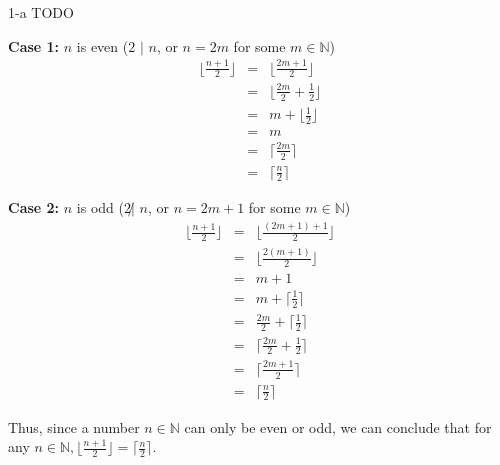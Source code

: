 \documentclass[11pt]{article}
\begin{document}
\begin{prob}{1-a}
TODO
\end{prob}
\begin{sol}

\textbf{Case 1:} $n$ is even ($2$ $|$ $n$, or $n = 2m$ for some $m \in \mathbb{N}$) 
\begin{eqnarray*}
\Big\lfloor\frac{n+1}{2}\Big\rfloor & = & \Big\lfloor\frac{2m + 1}{2}\Big\rfloor \\
& = & \Big\lfloor\frac{2m}{2}  + \frac{1}{2}\Big\rfloor\\
& = & m + \Big\lfloor\frac{1}{2}\Big\rfloor \\
& = & m \\
& = & \Big\lceil\frac{2m}{2}\Big\rceil \\
& = & \Big\lceil\frac{n}{2}\Big\rceil
\end{eqnarray*}

\textbf{Case 2:} $n$ is odd ($2 \not|$  $n$, or $n = 2m + 1$ for some $m \in \mathbb{N}$) 
\begin{eqnarray*}
\Big\lfloor\frac{n+1}{2}\Big\rfloor & = & \Big\lfloor\frac{(2m + 1) +1}{2}\Big\rfloor \\
& = & \Big\lfloor\frac{2(m + 1)}{2}\Big\rfloor \\
& = & m + 1 \\
& = & m + \Big\lceil\frac{1}{2}\Big\rceil \\
& = & \frac{2m}{2} + \Big\lceil\frac{1}{2}\Big\rceil \\
& = & \Big\lceil\frac{2m}{2} + \frac{1}{2}\Big\rceil \\
& = & \Big\lceil\frac{2m + 1}{2}\Big\rceil  \\
& = & \Big\lceil\frac{n}{2}\Big\rceil
\end{eqnarray*}

Thus, since a number $n \in \mathbb{N}$ can only be even or odd, we can conclude that for any $n \in \mathbb{N}, \Big\lfloor\frac{n+1}{2}\Big\rfloor = \Big\lceil\frac{n}{2}\Big\rceil$.
\end{sol}
\end{document}
